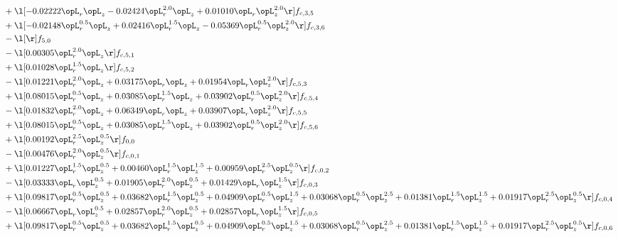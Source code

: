 \begin{alignat}{2}
& + \l[  -0.02222 \opL_r \opL_z   -0.02424 \opL_r^{2.0} \opL_z +  0.01010 \opL_r \opL_z^{2.0}  \r] f_{c,3,5} \nonumber \\ 
& + \l[  -0.02148 \opL_r^{0.5} \opL_z +  0.02416 \opL_r^{1.5} \opL_z   -0.05369 \opL_r^{0.5} \opL_z^{2.0}  \r] f_{c,3,6} \nonumber \\ 
& - \l[  \r] f_{5,0} \nonumber \\ 
& - \l[  0.00305 \opL_r^{2.0} \opL_z  \r] f_{c,5,1} \nonumber \\ 
& + \l[  0.01028 \opL_r^{1.5} \opL_z  \r] f_{c,5,2} \nonumber \\ 
& - \l[  0.01221 \opL_r^{2.0} \opL_z +  0.03175 \opL_r \opL_z +  0.01954 \opL_r \opL_z^{2.0}  \r] f_{c,5,3} \nonumber \\ 
& + \l[  0.08015 \opL_r^{0.5} \opL_z +  0.03085 \opL_r^{1.5} \opL_z +  0.03902 \opL_r^{0.5} \opL_z^{2.0}  \r] f_{c,5,4} \nonumber \\ 
& - \l[  0.01832 \opL_r^{2.0} \opL_z +  0.06349 \opL_r \opL_z +  0.03907 \opL_r \opL_z^{2.0}  \r] f_{c,5,5} \nonumber \\ 
& + \l[  0.08015 \opL_r^{0.5} \opL_z +  0.03085 \opL_r^{1.5} \opL_z +  0.03902 \opL_r^{0.5} \opL_z^{2.0}  \r] f_{c,5,6} \nonumber \\ 
& + \l[  0.00192 \opL_r^{2.5} \opL_z^{0.5}  \r] f_{0,0} \nonumber \\ 
& - \l[  0.00476 \opL_r^{2.0} \opL_z^{0.5}  \r] f_{c,0,1} \nonumber \\ 
& + \l[  0.01227 \opL_r^{1.5} \opL_z^{0.5} +  0.00460 \opL_r^{1.5} \opL_z^{1.5} +  0.00959 \opL_r^{2.5} \opL_z^{0.5}  \r] f_{c,0,2} \nonumber \\ 
& - \l[  0.03333 \opL_r \opL_z^{0.5} +  0.01905 \opL_r^{2.0} \opL_z^{0.5} +  0.01429 \opL_r \opL_z^{1.5}  \r] f_{c,0,3} \nonumber \\ 
& + \l[  0.09817 \opL_r^{0.5} \opL_z^{0.5} +  0.03682 \opL_r^{1.5} \opL_z^{0.5} +  0.04909 \opL_r^{0.5} \opL_z^{1.5} +  0.03068 \opL_r^{0.5} \opL_z^{2.5} +  0.01381 \opL_r^{1.5} \opL_z^{1.5} +  0.01917 \opL_r^{2.5} \opL_z^{0.5}  \r] f_{c,0,4} \nonumber \\ 
& - \l[  0.06667 \opL_r \opL_z^{0.5} +  0.02857 \opL_r^{2.0} \opL_z^{0.5} +  0.02857 \opL_r \opL_z^{1.5}  \r] f_{c,0,5} \nonumber \\ 
& + \l[  0.09817 \opL_r^{0.5} \opL_z^{0.5} +  0.03682 \opL_r^{1.5} \opL_z^{0.5} +  0.04909 \opL_r^{0.5} \opL_z^{1.5} +  0.03068 \opL_r^{0.5} \opL_z^{2.5} +  0.01381 \opL_r^{1.5} \opL_z^{1.5} +  0.01917 \opL_r^{2.5} \opL_z^{0.5}  \r] f_{c,0,6} \nonumber \\ 

\end{alignat}
